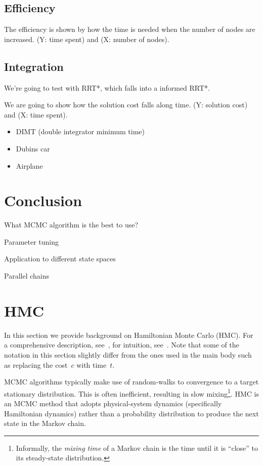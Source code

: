 \documentclass[letterpaper, 10 pt, conference]{ieeeconf}  %
\begin{document}
\subsection{Efficiency}

The efficiency is shown by how the time is needed when the number of nodes are increased.
(Y: time spent) and (X: number of nodes).

\subsection{Integration}

We're going to test with RRT*, which falls into a informed RRT*.

We are going to show how the solution cost falls along time.
(Y: solution cost) and (X: time spent).

\begin{itemize}
\item DIMT (double integrator minimum time)
\item Dubins car
\item Airplane
\end{itemize}

\section{Conclusion}

What MCMC algorithm is the best to use?

Parameter tuning

Application to different state spaces

Parallel chains

\appendix
\section{HMC}

In this section we provide background on Hamiltonian Monte Carlo (HMC). 
For a comprehensive description, see~\cite{N11},
for intuition, see~\cite{ZRDPKDBS13}.
Note that some of the notation in this section slightly differ from the ones used in the main body such as replacing the cost~$c$ with time~$t$. 

MCMC algorithms typically make use of random-walks to convergence to a target stationary distribution.
This is often inefficient, resulting in slow mixing\footnote{Informally, the \emph{mixing time} of a Markov chain is the time until it is ``close'' to its steady-state distribution.}.
HMC is an MCMC method that adopts physical-system dynamics (specifically Hamiltonian dynamics) rather than a probability distribution to produce the next state in the Markov chain. 
\end{document}
